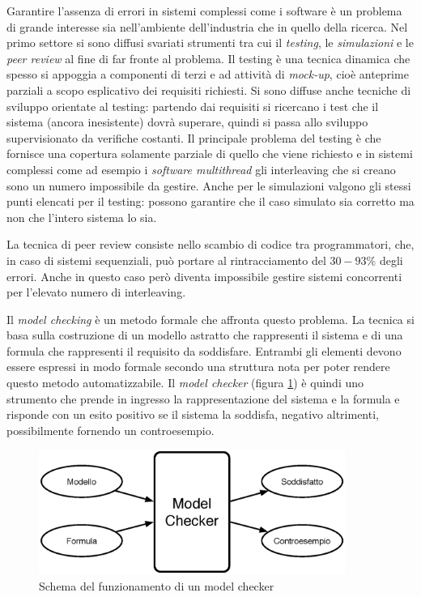 
Garantire l'assenza di errori in sistemi complessi come i software è un problema di grande interesse sia nell'ambiente dell'industria che in quello della ricerca. Nel primo settore si sono diffusi svariati strumenti tra cui il \emph{testing}, le \emph{simulazioni} e le \emph{peer review} al fine di far fronte al problema. Il testing è una tecnica dinamica che spesso si appoggia a componenti di terzi e ad attività di \emph{mock-up}, cioè anteprime parziali a scopo esplicativo dei requisiti richiesti. Si sono diffuse anche tecniche di sviluppo orientate al testing: partendo dai requisiti si ricercano i test che il sistema (ancora inesistente) dovrà superare, quindi si passa allo sviluppo supervisionato da verifiche costanti. Il principale problema del testing è che fornisce una copertura solamente parziale di quello che viene richiesto e in sistemi complessi come ad esempio i \emph{software multithread} gli interleaving che si creano sono un numero impossibile da gestire. Anche per le simulazioni valgono gli stessi punti elencati per il testing: possono garantire che il caso simulato sia corretto ma non che l'intero sistema lo sia.

La tecnica di peer review consiste nello scambio di codice tra programmatori, che, in caso di sistemi sequenziali, può portare al rintracciamento del $30-93\%$ degli errori. Anche in questo caso però diventa impossibile gestire sistemi concorrenti per l'elevato numero di interleaving.

Il \emph{model checking} è un metodo formale che affronta questo problema. La tecnica si basa sulla costruzione di un modello astratto che rappresenti il sistema e di una formula che rappresenti il requisito da soddisfare. Entrambi gli elementi devono essere espressi in modo formale secondo una struttura nota per poter rendere questo metodo automatizzabile. Il \emph{model checker} (figura \ref{fig:modelchecker}) è quindi uno strumento che prende in ingresso la rappresentazione del sistema e la formula e risponde con un esito positivo se il sistema la soddisfa, negativo altrimenti, possibilmente fornendo un controesempio.
\begin{figure}[htbp!]
	\begin{center}
		\includegraphics[width=10cm]{Images/mc.eps}
	\end{center}
\caption{Schema del funzionamento di un model checker}
\label{fig:modelchecker}
\end{figure}

